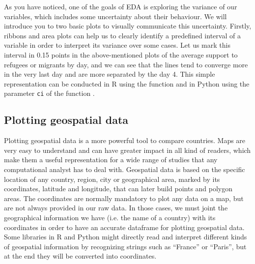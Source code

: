 
As you have noticed, one of the goals of EDA is exploring the variance of our variables, which includes some uncertainty about their behaviour. We will introduce you to two basic plots to visually communicate this uncertainty. Firstly, ribbons and area plots can help us to clearly identify a predefined interval of a variable in order to interpret its variance over some cases. Let us mark this interval in 0.15 points in the above-mentioned plots of the average support to refugees or migrants by day, and we can see that the lines tend to converge more in the very last day and are more separated by the day 4. This simple representation can be conducted in R using the  function  and in Python using the parameter \texttt{ci} of the  function .  





\subsection{Plotting geospatial data}

Plotting geospatial data is a more powerful tool to compare countries.  Maps are very easy to understand and can have greater impact in all kind of readers, which make them a useful representation for a wide range of studies that any computational analyst has to deal with. Geospatial data is based on the specific location of any country, region, city or geographical area, marked by its coordinates, latitude and longitude, that can later build points and polygon areas. The coordinates are normally mandatory to plot any data on a map, but are not always provided in our raw data. In those cases, we must joint the geographical information we have (i.e. the name of a country) with its coordinates in order to have an accurate dataframe for plotting geospatial data. Some libraries in R and Python might directly read and interpret different kinds of geospatial information by recognizing strings such as “France” or “Paris”, but at the end they will be converted into coordinates. 

